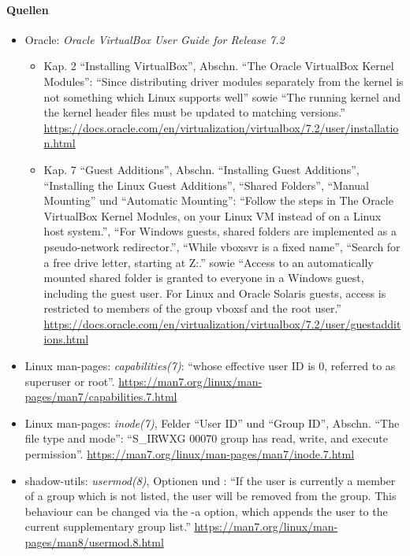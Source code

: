 \paragraph{Quellen}
\begin{itemize}[quellen]
  \item Oracle: \emph{Oracle VirtualBox User Guide for Release 7.2}
  \begin{itemize}[nosep]
    \item Kap. 2 \enquote{Installing VirtualBox}, Abschn. \enquote{The Oracle VirtualBox Kernel Modules}: \enquote{Since distributing driver modules separately from the kernel is not something which Linux supports well} sowie \enquote{The running kernel and the kernel header files must be updated to matching versions.} \url{https://docs.oracle.com/en/virtualization/virtualbox/7.2/user/installation.html}
    \item Kap. 7 \enquote{Guest Additions}, Abschn. \enquote{Installing Guest Additions}, \enquote{Installing the Linux Guest Additions}, \enquote{Shared Folders}, \enquote{Manual Mounting} und \enquote{Automatic Mounting}: \enquote{Follow the steps in The Oracle VirtualBox Kernel Modules, on your Linux VM instead of on a Linux host system.}, \enquote{For Windows guests, shared folders are implemented as a pseudo-network redirector.}, \enquote{While vboxsvr is a fixed name}, \enquote{Search for a free drive letter, starting at Z:.} sowie \enquote{Access to an automatically mounted shared folder is granted to everyone in a Windows guest, including the guest user. For Linux and Oracle Solaris guests, access is restricted to members of the group vboxsf and the root user.} \url{https://docs.oracle.com/en/virtualization/virtualbox/7.2/user/guestadditions.html}
  \end{itemize}
  \item Linux man-pages: \emph{capabilities(7)}: \enquote{whose effective user ID is 0, referred to as superuser or root}. \url{https://man7.org/linux/man-pages/man7/capabilities.7.html}
  \item Linux man-pages: \emph{inode(7)}, Felder \enquote{User ID} und \enquote{Group ID}, Abschn. \enquote{The file type and mode}: \enquote{S\_IRWXG 00070 group has read, write, and execute permission}. \url{https://man7.org/linux/man-pages/man7/inode.7.html}
  \item shadow-utils: \emph{usermod(8)}, Optionen  und : \enquote{If the user is currently a member of a group which is not listed, the user will be removed from the group. This behaviour can be changed via the -a option, which appends the user to the current supplementary group list.} \url{https://man7.org/linux/man-pages/man8/usermod.8.html}

\end{itemize}
